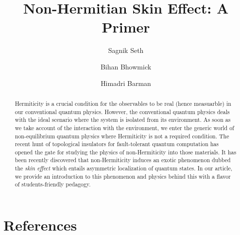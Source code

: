 \documentclass[aps,prb,epsf,epsfig,floatfix,showpacs,groupedaddres,superscriptaddress]{revtex4-1}
\numberwithin{equation}{section}
\def\bi{\begin{itemize}}
\def\ei{\end{itemize}}
\def\i{\item}
\def\alert#1{\textcolor{red}{#1}}  %
\begin{document}
\title{Non-Hermitian Skin Effect: A Primer}
\author{Sagnik Seth}
%
\author{Bihan Bhowmick}
%
%
\author{Himadri Barman}
%
\begin{abstract}
Hermiticity is a crucial condition for the observables to be real (hence measuarble) 
in our conventional quantum physics.
However, the conventional quantum physics deals with the ideal scenario where the system
is isolated from its environment. As soon as we take account of the interaction with the 
environment, we enter the generic world of non-equilibrium quantum physics where Hermiticity
is not a required condition. The recent hunt of topological insulators for fault-tolerant 
quantum computation has opened the gate for studying the physics of non-Hermiticity into
those materials. It has been recently discovered that non-Hermiticity induces an exotic
phenomenon dubbed the \emph{skin effect} which entails asymmetric localization of 
quantum states. In our article, we provide an introduction to this phenomenon and physics
behind this with a flavor of students-friendly pedagogy.    
\end{abstract}
\maketitle

\def\hHN{{\hat H}_{\rm{HN}} }
\def\hSSH{{\hat H}_{\rm{SSH}} }
\def\hNHSSH{{\hat H}_{\rm{NHSSH}} }
\tableofcontents




% 
% 
% 
% 
% 
% 
% 
% 
% 
% 












\section*{References}
%
%

\end{document}
